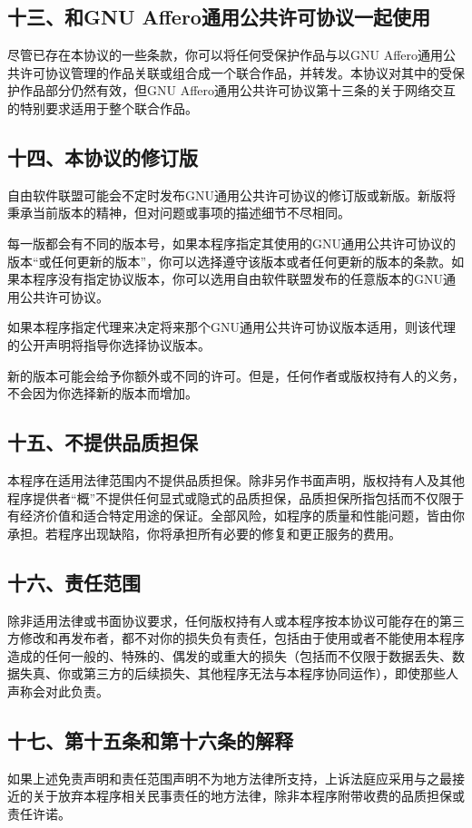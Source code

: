 \subsection{十三、和GNU Affero通用公共许可协议一起使用}
尽管已存在本协议的一些条款，你可以将任何受保护作品与以GNU Affero通用公共许可协议管理的作品关联或组合成一个联合作品，并转发。本协议对其中的受保护作品部分仍然有效，但GNU Affero通用公共许可协议第十三条的关于网络交互的特别要求适用于整个联合作品。
\subsection{十四、本协议的修订版}
自由软件联盟可能会不定时发布GNU通用公共许可协议的修订版或新版。新版将秉承当前版本的精神，但对问题或事项的描述细节不尽相同。\par
每一版都会有不同的版本号，如果本程序指定其使用的GNU通用公共许可协议的版本“或任何更新的版本”，你可以选择遵守该版本或者任何更新的版本的条款。如果本程序没有指定协议版本，你可以选用自由软件联盟发布的任意版本的GNU通用公共许可协议。\par
如果本程序指定代理来决定将来那个GNU通用公共许可协议版本适用，则该代理的公开声明将指导你选择协议版本。\par
新的版本可能会给予你额外或不同的许可。但是，任何作者或版权持有人的义务，不会因为你选择新的版本而增加。\par
\subsection{十五、不提供品质担保}
本程序在适用法律范围内不提供品质担保。除非另作书面声明，版权持有人及其他程序提供者“概”不提供任何显式或隐式的品质担保，品质担保所指包括而不仅限于有经济价值和适合特定用途的保证。全部风险，如程序的质量和性能问题，皆由你承担。若程序出现缺陷，你将承担所有必要的修复和更正服务的费用。
\subsection{十六、责任范围}
除非适用法律或书面协议要求，任何版权持有人或本程序按本协议可能存在的第三方修改和再发布者，都不对你的损失负有责任，包括由于使用或者不能使用本程序造成的任何一般的、特殊的、偶发的或重大的损失（包括而不仅限于数据丢失、数据失真、你或第三方的后续损失、其他程序无法与本程序协同运作），即使那些人声称会对此负责。
\subsection{十七、第十五条和第十六条的解释}
如果上述免责声明和责任范围声明不为地方法律所支持，上诉法庭应采用与之最接近的关于放弃本程序相关民事责任的地方法律，除非本程序附带收费的品质担保或责任许诺。
